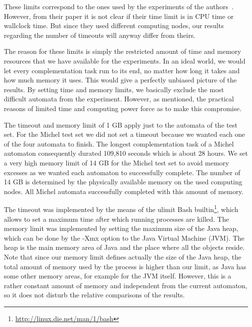 These limits correspond to the ones used by the experiments of the \goal{} authors~\cite{2011_tsai}. However, from their paper it is not clear if their time limit is in CPU time or wallclock time. But since they used different computing nodes, our results regarding the number of timeouts will anyway differ from theirs.

The reason for these limits is simply the restricted amount of time and memory resources that we have available for the experiments. In an ideal world, we would let every complementation task run to its end, no matter how long it takes and how much memory it uses. This would give a perfectly unbiased picture of the results. By setting time and memory limits, we basically exclude the most difficult automata from the experiment. However, as mentioned, the practical reasons of limited time and computing power force as to make this compromise.

The timeout and memory limit of 1 GB apply just to the automata of the \goal{} test set. For the Michel test set we did not set a timeout because we wanted each one of the four automata to finish. The longest complementation task of a Michel automaton consequently durated 109,810 seconds which is about 28 hours. We set a very high memory limit of 14 GB for the Michel test set to avoid memory excesses as we wanted each automaton to successfully complete. The number of 14 GB is determined by the physically available memory on the used computing nodes. All Michel automata successfully completed with this amount of memory.

The timeout was implemented by the means of the \textsf{ulimit} Bash builtin\footnote{\url{http://linux.die.net/man/1/bash}}, which allows to set a maximum time after which running processes are killed. The memory limit was implemented by setting the maximum size of the Java heap, which can be done by the \textsf{-Xmx} option to the Java Virtual Machine (JVM). The heap is the main memory area of Java and the place where all the objects reside. Note that since our memory limit defines actually the size of the Java heap, the total amount of memory used by the process is higher than our limit, as Java has some other memory areas, for example for the JVM itself. However, this is a rather constant amount of memory and independent from the current automaton, so it does not disturb the relative comparisons of the results.

